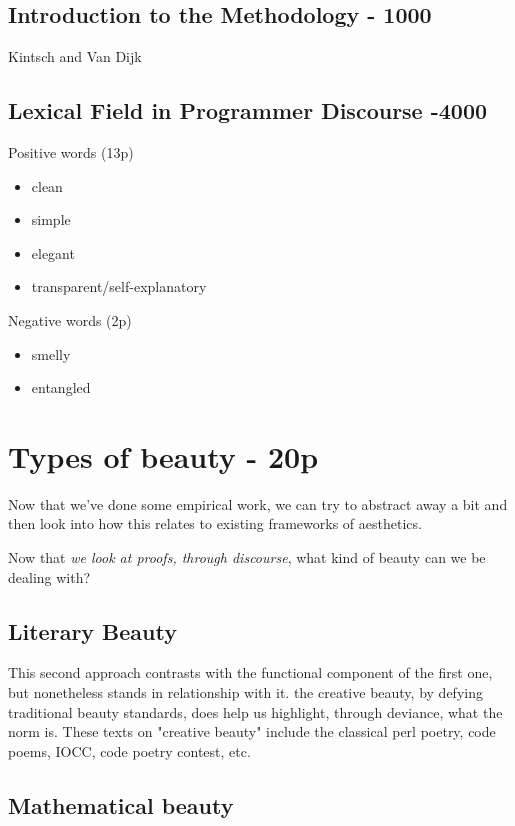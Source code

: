 \subsection{Introduction to the Methodology - 1000}

Kintsch and Van Dijk

\subsection{Lexical Field in Programmer Discourse -4000}

Positive words (13p)

\begin{itemize}
    \item clean
    \item simple
    \item elegant
    \item transparent/self-explanatory
\end{itemize}

Negative words (2p)

\begin{itemize}
    \item smelly
    \item entangled
\end{itemize}

\section{Types of beauty  - 20p}

Now that we've done some empirical work, we can try to abstract away a bit and then look into how this relates to existing frameworks of aesthetics. 

Now that \emph{we look at proofs, through discourse}, what kind of beauty can we be dealing with?

\subsection{Literary Beauty}

This second approach contrasts with the functional component of the first one, but nonetheless stands in relationship with it. the creative beauty, by defying traditional beauty standards, does help us highlight, through deviance, what the norm is. These texts on "creative beauty" include the classical perl poetry, code poems, IOCC, code poetry contest, etc.

\subsection{Mathematical beauty}

